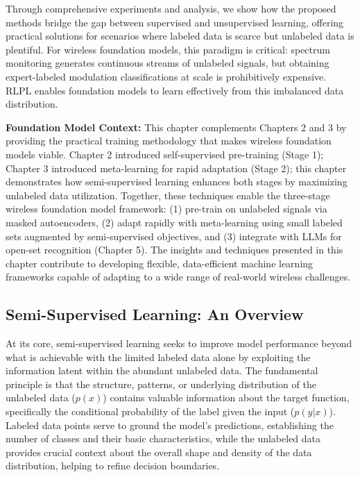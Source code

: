 Through comprehensive experiments and analysis, we show how the proposed methods bridge the gap between supervised and unsupervised learning, offering practical solutions for scenarios where labeled data is scarce but unlabeled data is plentiful. For wireless foundation models, this paradigm is critical: spectrum monitoring generates continuous streams of unlabeled signals, but obtaining expert-labeled modulation classifications at scale is prohibitively expensive. RLPL enables foundation models to learn effectively from this imbalanced data distribution.

\textbf{Foundation Model Context:} This chapter complements Chapters 2 and 3 by providing the practical training methodology that makes wireless foundation models viable. Chapter 2 introduced self-supervised pre-training (Stage 1); Chapter 3 introduced meta-learning for rapid adaptation (Stage 2); this chapter demonstrates how semi-supervised learning enhances both stages by maximizing unlabeled data utilization. Together, these techniques enable the three-stage wireless foundation model framework: (1) pre-train on unlabeled signals via masked autoencoders, (2) adapt rapidly with meta-learning using small labeled sets augmented by semi-supervised objectives, and (3) integrate with LLMs for open-set recognition (Chapter 5). The insights and techniques presented in this chapter contribute to developing flexible, data-efficient machine learning frameworks capable of adapting to a wide range of real-world wireless challenges.

\subsection{Semi-Supervised Learning: An Overview}

At its core, semi-supervised learning seeks to improve model performance beyond what is achievable with the limited labeled data alone by exploiting the information latent within the abundant unlabeled data. The fundamental principle is that the structure, patterns, or underlying distribution of the unlabeled data ($p(x)$) contains valuable information about the target function, specifically the conditional probability of the label given the input ($p(y|x)$). Labeled data points serve to ground the model's predictions, establishing the number of classes and their basic characteristics, while the unlabeled data provides crucial context about the overall shape and density of the data distribution, helping to refine decision boundaries.

